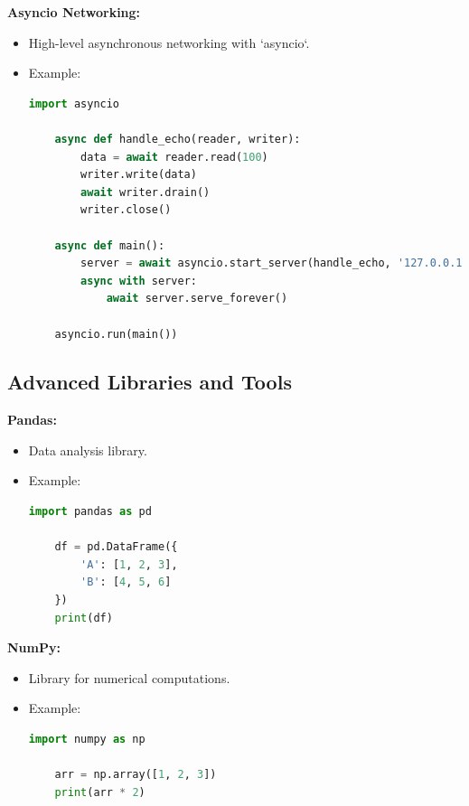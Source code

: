 \documentclass[12pt]{article}
\begin{document}
\textbf{Asyncio Networking:}
\begin{itemize}
    \item High-level asynchronous networking with `asyncio`.

    \item Example:\\
    \begin{lstlisting}[language = Python]
    import asyncio

    async def handle_echo(reader, writer):
        data = await reader.read(100)
        writer.write(data)
        await writer.drain()
        writer.close()
    
    async def main():
        server = await asyncio.start_server(handle_echo, '127.0.0.1', 8888)
        async with server:
            await server.serve_forever()
    
    asyncio.run(main())
    \end{lstlisting}
    
\end{itemize}


\subsection{Advanced Libraries and Tools}

\textbf{Pandas:}
\begin{itemize}
    \item Data analysis library.

    \item Example:\\
    \begin{lstlisting}[language = Python]
    import pandas as pd

    df = pd.DataFrame({
        'A': [1, 2, 3],
        'B': [4, 5, 6]
    })
    print(df)
    \end{lstlisting}
    
\end{itemize}




\textbf{NumPy:}
\begin{itemize}
    \item Library for numerical computations.

    \item Example:\\
    \begin{lstlisting}[language = Python]
    import numpy as np

    arr = np.array([1, 2, 3])
    print(arr * 2)
    \end{lstlisting}
    
\end{itemize}
\end{document}
